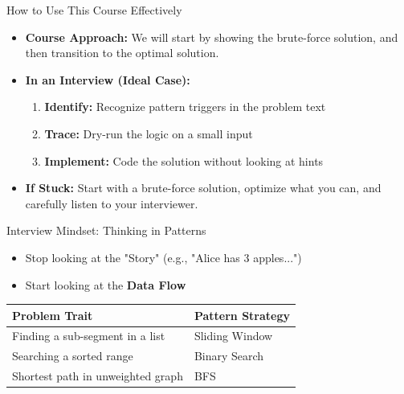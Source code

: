 \begin{frame}{How to Use This Course Effectively}
  \begin{itemize}
    \item \textbf{Course Approach:} We will start by showing the brute-force solution, and then transition to the optimal solution.
    \item \textbf{In an Interview (Ideal Case):}
      \begin{enumerate}
        \item \textbf{Identify:} Recognize pattern triggers in the problem text 
        \item \textbf{Trace:} Dry-run the logic on a small input 
        \item \textbf{Implement:} Code the solution without looking at hints 
      \end{enumerate}
    \item \textbf{If Stuck:} Start with a brute-force solution, optimize what you can, and carefully listen to your interviewer.
  \end{itemize}
\end{frame}

\begin{frame}{Interview Mindset: Thinking in Patterns}
  \begin{itemize}
    \item Stop looking at the "Story" (e.g., "Alice has 3 apples...")
    \item Start looking at the \textbf{Data Flow}
  \end{itemize}
  
  \begin{table}[]
    \scriptsize
    \begin{tabular}{ll}
        \toprule
        \textbf{Problem Trait} & \textbf{Pattern Strategy} \\ \midrule
        Finding a sub-segment in a list & Sliding Window \\
        Searching a sorted range & Binary Search \\
        Shortest path in unweighted graph & BFS \\ \bottomrule
    \end{tabular}
  \end{table}
\end{frame}
  


